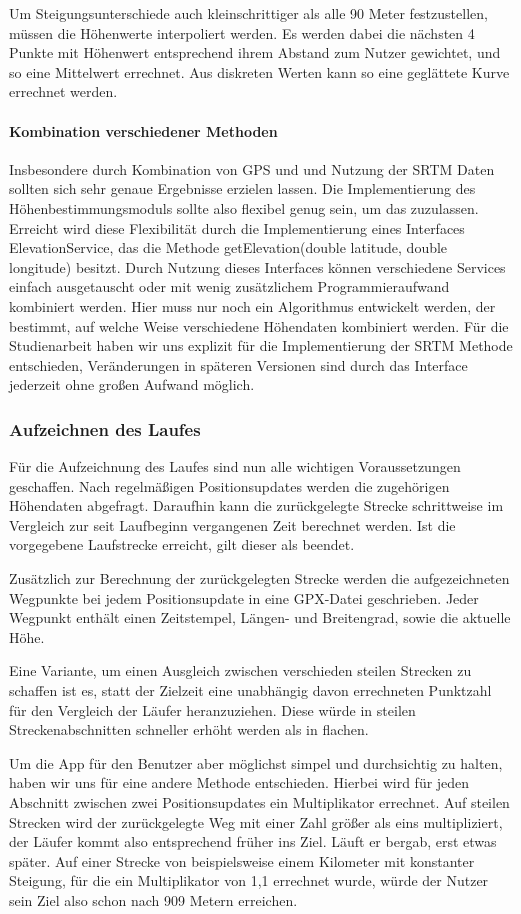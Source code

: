 Um Steigungsunterschiede auch kleinschrittiger als alle 90 Meter festzustellen, müssen die Höhenwerte interpoliert werden. Es werden dabei die nächsten 4 Punkte mit Höhenwert entsprechend ihrem Abstand zum Nutzer gewichtet, und so eine Mittelwert errechnet. Aus diskreten Werten kann so eine geglättete Kurve errechnet werden.
\paragraph{Kombination verschiedener Methoden}
Insbesondere durch Kombination von GPS und und Nutzung der SRTM Daten sollten sich sehr genaue Ergebnisse erzielen lassen. Die Implementierung des Höhenbestimmungsmoduls sollte also flexibel genug sein, um das zuzulassen. Erreicht wird diese Flexibilität durch die Implementierung eines Interfaces ElevationService, das die Methode getElevation(double latitude, double longitude) besitzt. Durch Nutzung dieses Interfaces können verschiedene Services einfach ausgetauscht oder mit wenig zusätzlichem Programmieraufwand kombiniert werden. Hier muss nur noch ein Algorithmus entwickelt werden, der bestimmt, auf welche Weise verschiedene Höhendaten kombiniert werden. Für die Studienarbeit haben wir uns explizit für die Implementierung der SRTM Methode entschieden, Veränderungen in späteren Versionen sind durch das Interface jederzeit ohne großen Aufwand möglich.
\subsubsection{Aufzeichnen des Laufes}
Für die Aufzeichnung des Laufes sind nun alle wichtigen Voraussetzungen geschaffen. Nach regelmäßigen Positionsupdates werden die zugehörigen Höhendaten abgefragt. Daraufhin kann die zurückgelegte Strecke schrittweise im Vergleich zur seit Laufbeginn vergangenen Zeit berechnet werden. Ist die vorgegebene Laufstrecke erreicht, gilt dieser als beendet.

Zusätzlich zur Berechnung der zurückgelegten Strecke werden die aufgezeichneten Wegpunkte bei jedem Positionsupdate in eine GPX-Datei geschrieben. Jeder Wegpunkt enthält einen Zeitstempel, Längen- und Breitengrad, sowie die aktuelle Höhe.

Eine Variante, um einen Ausgleich zwischen verschieden steilen Strecken zu schaffen ist es, statt der Zielzeit eine unabhängig davon errechneten Punktzahl für den Vergleich der Läufer heranzuziehen. Diese würde in steilen Streckenabschnitten schneller erhöht werden als in flachen.

Um die App für den Benutzer aber möglichst simpel und durchsichtig zu halten, haben wir uns für eine andere Methode entschieden. Hierbei wird für jeden Abschnitt zwischen zwei Positionsupdates ein Multiplikator errechnet. Auf steilen Strecken wird der zurückgelegte Weg mit einer Zahl größer als eins multipliziert, der Läufer kommt also entsprechend früher ins Ziel. Läuft er bergab, erst etwas später. Auf einer Strecke von beispielsweise einem Kilometer mit konstanter Steigung, für die ein Multiplikator von 1,1 errechnet wurde, würde der Nutzer sein Ziel also schon nach 909 Metern erreichen.

